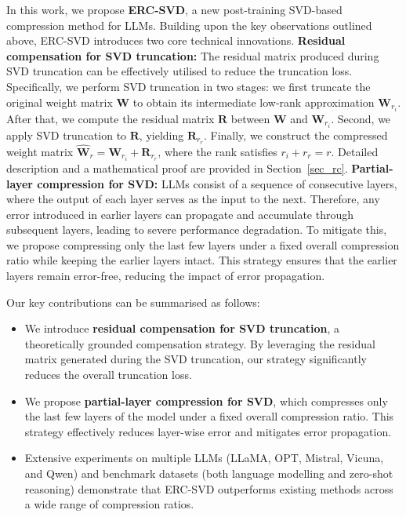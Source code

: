 In this work, we propose \textbf{ERC-SVD}, a new post-training SVD-based compression method for LLMs. 
Building upon the key observations outlined above, ERC-SVD introduces two core technical innovations.
 \textbf{Residual compensation for SVD truncation:} The residual matrix produced during SVD truncation can be effectively utilised to reduce the truncation loss. 
Specifically, we perform SVD truncation in two stages: we first truncate the original weight matrix $\boldsymbol{W}$ to obtain its intermediate low-rank approximation $\boldsymbol{W}_{r_i}$. After that, we compute the residual matrix $\boldsymbol{R}$ between $\boldsymbol{W}$ and $\boldsymbol{W}_{r_i}$. 
Second, we apply SVD truncation to $\boldsymbol{R}$, yielding $\boldsymbol{R}_{r_r}$. 
Finally, we construct the compressed weight matrix $\boldsymbol{\hat{W}}_{r}=\boldsymbol{W}_{r_i}+\boldsymbol{R}_{r_r}$, where the rank satisfies $r_i + r_r = r$. Detailed description and a mathematical proof are provided in Section~\ref{sec_rc}.  \textbf{Partial-layer compression for SVD:} LLMs consist of a sequence of consecutive layers, where the output of each layer serves as the input to the next. 
Therefore, any error introduced in earlier layers can propagate and accumulate through subsequent layers, leading to severe performance degradation. 
To mitigate this, we propose compressing only the last few layers under a fixed overall compression ratio while keeping the earlier layers intact. This strategy ensures that the earlier layers remain error-free, reducing the impact of error propagation.

Our key contributions can be summarised as follows:
\begin{itemize}
    \item We introduce \textbf{residual compensation for SVD truncation}, a theoretically grounded compensation strategy. By leveraging the residual matrix generated during the SVD truncation, our strategy significantly reduces the overall truncation loss.
    \item We propose \textbf{partial-layer compression for SVD}, which compresses only the last few layers of the model under a fixed overall compression ratio. This strategy effectively reduces layer-wise error and mitigates error propagation.
    \item Extensive experiments on multiple LLMs (LLaMA, OPT, Mistral, Vicuna, and Qwen) and benchmark datasets (both language modelling and zero-shot reasoning) demonstrate that ERC-SVD outperforms existing methods across a wide range of compression ratios.
\end{itemize}